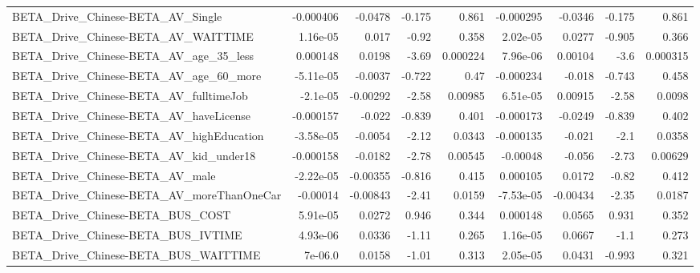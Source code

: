 \begin{tabular}{lrrrrrrrr}
BETA\_Drive\_Chinese-BETA\_AV\_Single                  &   -0.000406 &      -0.0478 &    -0.175 &    0.861 &  -0.000295 &     -0.0346 &       -0.175 &         0.861 \\
BETA\_Drive\_Chinese-BETA\_AV\_WAITTIME                &    1.16e-05 &        0.017 &     -0.92 &    0.358 &   2.02e-05 &      0.0277 &       -0.905 &         0.366 \\
BETA\_Drive\_Chinese-BETA\_AV\_age\_35\_less             &    0.000148 &       0.0198 &     -3.69 & 0.000224 &   7.96e-06 &     0.00104 &         -3.6 &      0.000315 \\
BETA\_Drive\_Chinese-BETA\_AV\_age\_60\_more             &   -5.11e-05 &      -0.0037 &    -0.722 &     0.47 &  -0.000234 &      -0.018 &       -0.743 &         0.458 \\
BETA\_Drive\_Chinese-BETA\_AV\_fulltimeJob             &    -2.1e-05 &     -0.00292 &     -2.58 &  0.00985 &   6.51e-05 &     0.00915 &        -2.58 &        0.0098 \\
BETA\_Drive\_Chinese-BETA\_AV\_haveLicense             &   -0.000157 &       -0.022 &    -0.839 &    0.401 &  -0.000173 &     -0.0249 &       -0.839 &         0.402 \\
BETA\_Drive\_Chinese-BETA\_AV\_highEducation           &   -3.58e-05 &      -0.0054 &     -2.12 &   0.0343 &  -0.000135 &      -0.021 &         -2.1 &        0.0358 \\
BETA\_Drive\_Chinese-BETA\_AV\_kid\_under18             &   -0.000158 &      -0.0182 &     -2.78 &  0.00545 &   -0.00048 &      -0.056 &        -2.73 &       0.00629 \\
BETA\_Drive\_Chinese-BETA\_AV\_male                    &   -2.22e-05 &     -0.00355 &    -0.816 &    0.415 &   0.000105 &      0.0172 &        -0.82 &         0.412 \\
BETA\_Drive\_Chinese-BETA\_AV\_moreThanOneCar          &    -0.00014 &     -0.00843 &     -2.41 &   0.0159 &  -7.53e-05 &    -0.00434 &        -2.35 &        0.0187 \\
BETA\_Drive\_Chinese-BETA\_BUS\_COST                   &    5.91e-05 &       0.0272 &     0.946 &    0.344 &   0.000148 &      0.0565 &        0.931 &         0.352 \\
BETA\_Drive\_Chinese-BETA\_BUS\_IVTIME                 &    4.93e-06 &       0.0336 &     -1.11 &    0.265 &   1.16e-05 &      0.0667 &         -1.1 &         0.273 \\
BETA\_Drive\_Chinese-BETA\_BUS\_WAITTIME               &     7e-06.0 &       0.0158 &     -1.01 &    0.313 &   2.05e-05 &      0.0431 &       -0.993 &         0.321 \\

\end{tabular}
